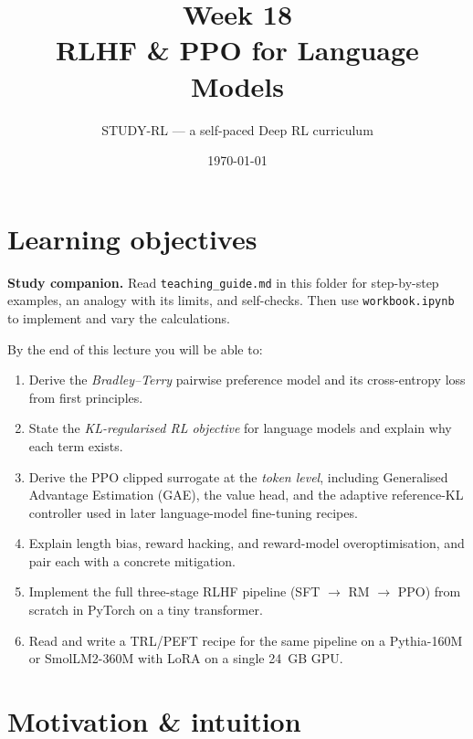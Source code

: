 \documentclass[11pt,oneside]{scrbook}
\title{{\color{rlblue}\textbf{Week 18} \\ \Huge RLHF \& PPO for Language Models}}
\author{STUDY-RL --- a self-paced Deep RL curriculum}
\date{\today}
\begin{document}
\maketitle
\tableofcontents
\newpage

\chapter*{Learning objectives}


\noindent\textbf{Study companion.} Read \texttt{teaching\_guide.md} in this
folder for step-by-step examples, an analogy with its limits, and self-checks.
Then use \texttt{workbook.ipynb} to implement and vary the calculations.
\par\medskip

\begin{keyidea}
By the end of this lecture you will be able to:
\begin{enumerate}[leftmargin=*]
  \item Derive the \emph{Bradley--Terry} pairwise preference model and its
        cross-entropy loss from first principles.
  \item State the \emph{KL-regularised RL objective} for language models and
        explain why each term exists.
  \item Derive the PPO clipped surrogate at the \emph{token level}, including
        Generalised Advantage Estimation (GAE), the value head, and the
        adaptive reference-KL controller used in later language-model fine-tuning recipes.
  \item Explain length bias, reward hacking, and reward-model
        overoptimisation, and pair each with a concrete mitigation.
  \item Implement the full three-stage RLHF pipeline (SFT $\to$ RM $\to$ PPO)
        from scratch in PyTorch on a tiny transformer.
  \item Read and write a TRL/PEFT recipe for the same pipeline on a
        Pythia-160M or SmolLM2-360M with LoRA on a single 24~GB GPU.
\end{enumerate}
\end{keyidea}

\chapter{Motivation \& intuition}

\end{document}
